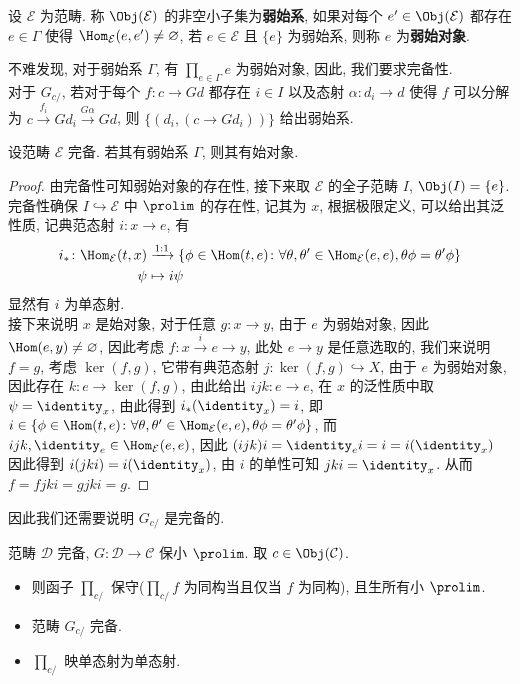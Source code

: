 \begin{definition}[弱始对象]
    设 $\mathcal{E}$ 为范畴. 称 $\Obj(\mathcal{E})$ 的非空小子集为\textbf{弱始系}, 如果对每个 $e'\in \Obj(\mathcal{E})$ 都存在 $e \in \Gamma$ 使得 $\Hom_{\mathcal{E}}(e,e') \neq\varnothing$, 若 $e \in \mathcal{E}$ 且 $\{e\}$ 为弱始系, 则称 $e$ 为\textbf{弱始对象}.
\end{definition}
不难发现, 对于弱始系 $\Gamma$, 有 $\prod_{e\in \Gamma} e$ 为弱始对象, 因此, 我们要求完备性.\\
对于 $G_{c/}$, 若对于每个 $f \colon c \to Gd$ 都存在 $i \in I$ 以及态射 $\alpha \colon d_i \to d$ 使得 $f$ 可以分解为 $c \xrightarrow{f_i}Gd_i \xrightarrow{G\alpha}Gd$, 则 $\{(d_i,(c\to Gd_i))\}$ 给出弱始系.
\begin{lemma}
    设范畴 $\mathcal{E}$ 完备. 若其有弱始系 $\Gamma$, 则其有始对象.
\end{lemma}
\begin{proof}
    由完备性可知弱始对象的存在性, 接下来取 $\mathcal{E}$ 的全子范畴 $I$, $\Obj(I) = \{e\}$. 完备性确保 $I \hookrightarrow \mathcal{E}$ 中 $\prolim$ 的存在性, 记其为 $x$, 根据极限定义, 可以给出其泛性质, 记典范态射 $i \colon x \to e$, 有
    \begin{align*}
        i_* \colon \Hom_{\mathcal{E}}(t,x) &\xrightarrow{1:1} \{\phi \in \Hom(t,e) \colon \forall \theta , \theta' \in \Hom_{\mathcal{E}}(e,e), \theta \phi = \theta'\phi\}\\
        \psi &\mapsto i\psi
    \end{align*}
    显然有 $i$ 为单态射.\\
    接下来说明 $x$ 是始对象, 对于任意 $g \colon x \to y$, 由于 $e$ 为弱始对象, 因此 $\Hom(e,y) \neq \varnothing$, 因此考虑 $f \colon x \xrightarrow{i} e\to y$, 此处 $e \to y$ 是任意选取的, 我们来说明 $f = g$, 考虑 $\ker(f,g)$, 它带有典范态射 $j \colon \ker(f,g) \hookrightarrow X$, 由于 $e$ 为弱始对象, 因此存在 $k \colon e \to \ker(f,g)$, 由此给出 $ijk \colon e \to e$, 在 $x$ 的泛性质中取 $\psi = \identity_x$, 由此得到 $i_*(\identity_x) = i$, 即 $i \in \{\phi \in \Hom(t,e) \colon \forall \theta , \theta' \in \Hom_{\mathcal{E}}(e,e), \theta \phi = \theta'\phi\}$, 而 $ijk, \identity_e \in \Hom_{\mathcal{E}}(e,e)$, 因此 $(ijk)i = \identity_e i = i = i(\identity_x)$ 因此得到 $i(jki) = i(\identity_x)$, 由 $i$ 的单性可知 $jki = \identity_x$. 从而 $f = fjki = gjki = g$.
\end{proof}
因此我们还需要说明 $G_{c/}$ 是完备的.
\begin{proposition}
    范畴 $\mathcal{D}$ 完备, $G \colon \mathcal{D} \to \mathcal{C}$ 保小 $\prolim$. 取 $c \in \Obj(\mathcal{C})$.
    \begin{itemize}
        \item 则函子 $\prod_{c/}$ 保守($\prod_{c/} f$ 为同构当且仅当 $f$ 为同构), 且生所有小 $\prolim$.
        \item 范畴 $G_{c/}$ 完备.
        \item $\prod_{c/}$ 映单态射为单态射.
    \end{itemize}
\end{proposition}
